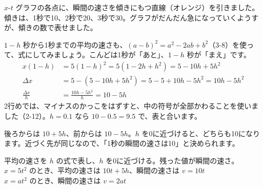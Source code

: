 \noindent\begin{minipage}[c]{0.5\linewidth}
\end{minipage}\hfill
\begin{minipage}[c]{0.46\linewidth}\raggedright
$x$-$t$ グラフの各点に、瞬間の速さを傾きにもつ直線（オレンジ）を引きました。傾きは、1秒で10、2秒で20、3秒で30。グラフがだんだん急になっていくようすが、傾きの数で表せました。
\end{minipage}


$1-h$ 秒から1秒までの平均の速さも、$(a-b)^2=a^2-2ab+b^2$（3-8）を使って、式にしてみましょう。こんどは1秒が「あと」、$1-h$ 秒が「まえ」です。
\begin{align*}
x(1-h)&=5(1-h)^2=5(1-2h+h^2)=5-10h+5h^2 \\
\Delta x&=5-(5-10h+5h^2)=5-5+10h-5h^2=10h-5h^2 \\
\frac{\Delta x}{h}&=\frac{10h-5h^2}{h}=10-5h
\end{align*}
2行めでは、マイナスのかっこをはずすと、中の符号が全部かわることを使いました（2-12）。$h=0.1$ なら $10-0.5=9.5$ で、表と合います。

後ろからは $10+5h$、前からは $10-5h$。$h$ を0に近づけると、どちらも10になります。近づく先が同じなので、「1秒の瞬間の速さは10」と決められます。

\begin{taisetsu}
平均の速さを $h$ の式で表し、$h$ を0に近づける。残った値が瞬間の速さ。\\
$x=5t^2$ のとき、平均の速さは $10t+5h$、瞬間の速さは $v=10t$\\
$x=at^2$ のとき、瞬間の速さは $v=2at$
\end{taisetsu}

\begin{kotoba}
\small
{}
\end{kotoba}

